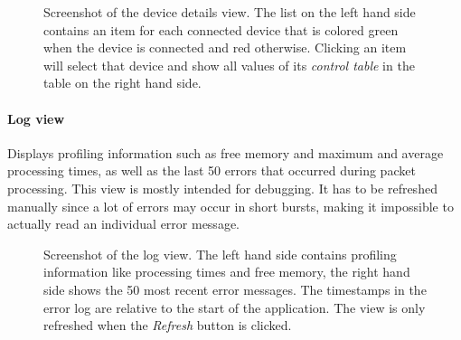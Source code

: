 \begin{figure}[H]
    \centering
    \setlength{\fboxsep}{0mm}
    \caption[Screenshot of the device details view]{
        Screenshot of the device details view. The list on the left hand side contains an item for
        each connected device that is colored green when the device is connected and red otherwise.
        Clicking an item will select that device and show all values of its \textit{control table}
        in the table on the right hand side.
    }
\end{figure}

\clearpage
\paragraph{Log view}

Displays profiling information such as free memory and maximum and average processing times, as well
as the last 50 errors that occurred during packet processing. This view is mostly intended for debugging.
It has to be refreshed manually since a lot of errors may occur in short bursts, making it impossible
to actually read an individual error message.

\begin{figure}[H]
    \centering
    \setlength{\fboxsep}{0mm}
    \caption[Screenshot of the log view]{
        Screenshot of the log view. The left hand side contains profiling information like processing
        times and free memory, the right hand side shows the 50 most recent error messages. The
        timestamps in the error log are relative to the start of the application. The view is only
        refreshed when the \textit{Refresh} button is clicked.
    }
\end{figure}

